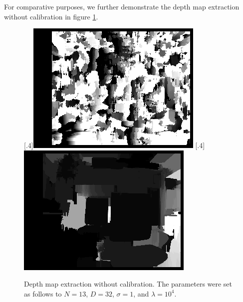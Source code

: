 For comparative purposes, we further demonstrate the depth map extraction without calibration in figure \ref{fig::52_no_calib}. 
\begin{figure}[h]
	\centering
	[.4\linewidth]{\includegraphics[scale=.3]{chapters/05_experiments/02_depth_map_parameter_tuning/disp_no_calib.png}}
	[.4\linewidth]{\includegraphics[scale=.3]{chapters/05_experiments/02_depth_map_parameter_tuning/wls_no_calib.png}}
	\caption{Depth map extraction without calibration. The parameters were set as follows to $N=13$, $D=32$, $\sigma = 1$, and $\lambda=10^4$.}
	\label{fig::52_no_calib}
\end{figure}